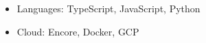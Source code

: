 \begin{itemize}
\item Languages: TypeScript, JavaScript, Python
\item Cloud: Encore, Docker, GCP
\end{itemize}
